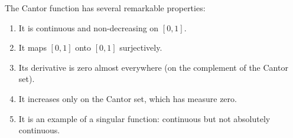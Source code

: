 \begin{figure}[ht!]
\label{fig:cantor_function}
\end{figure}

\begin{remark}
    The Cantor function has several remarkable properties:
    \begin{enumerate}
        \item It is continuous and non-decreasing on $[0,1]$.
        \item It maps $[0,1]$ onto $[0,1]$ surjectively.
        \item Its derivative is zero almost everywhere (on the complement of the Cantor set).
        \item It increases only on the Cantor set, which has measure zero.
        \item It is an example of a singular function: continuous but not absolutely continuous.
    \end{enumerate}
\end{remark}

